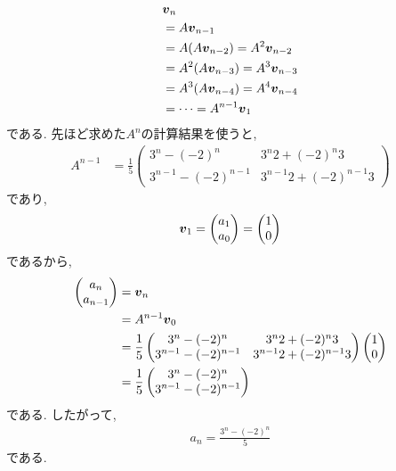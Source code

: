 \begin{example}
\begin{align*}
  &\boldsymbol{v}_{n}\\
  &=A\boldsymbol{v}_{n-1}\\
  &=A(A\boldsymbol{v}_{n-2})=A^2\boldsymbol{v}_{n-2}\\
  &=A^2(A\boldsymbol{v}_{n-3})=A^3\boldsymbol{v}_{n-3}\\
  &=A^3(A\boldsymbol{v}_{n-4})=A^4\boldsymbol{v}_{n-4}\\
  &=\cdots=A^{n-1}\boldsymbol{v}_1
\end{align*}
である.
先ほど求めた$A^n$の計算結果を使うと,
\begin{align*}
  A^{n-1}
    &=
  \frac{1}{5}
  \begin{pmatrix}
   3^{n}-(-2)^{n}&3^{n}2+(-2)^{n}3\\
    3^{n-1}-(-2)^{n-1}&3^{n-1}2+(-2)^{n-1}3    
  \end{pmatrix}
\end{align*}
であり,
\begin{align*}
  \boldsymbol{v}_1=\begin{pmatrix}a_1\\a_0\end{pmatrix}=\begin{pmatrix}1\\0\end{pmatrix}
\end{align*}
であるから,
\begin{align*}
  \begin{pmatrix}a_{n}\\a_{n-1}\end{pmatrix}
    &=
    \boldsymbol{v}_n\\
    &=
    A^{n-1}\boldsymbol{v}_0\\
    &=
  \frac{1}{5}
  \begin{pmatrix}
   3^{n}-(-2)^{n}&3^{n}2+(-2)^{n}3\\
    3^{n-1}-(-2)^{n-1}&3^{n-1}2+(-2)^{n-1}3    
  \end{pmatrix}
  \begin{pmatrix}1\\0\end{pmatrix}\\
    &=
    \frac{1}{5}
  \begin{pmatrix}
   3^{n}-(-2)^{n}\\
    3^{n-1}-(-2)^{n-1}
  \end{pmatrix}
\end{align*}
である.
したがって,
\begin{align*}
  a_n=
  \frac{3^{n}-(-2)^{n}}{5}
\end{align*}
である.
\end{example}


